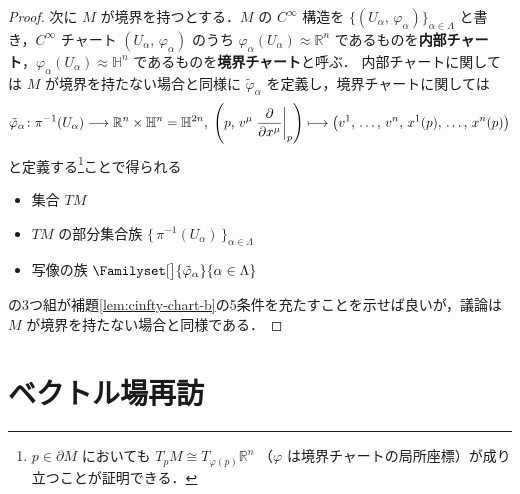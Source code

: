 \documentclass[geometry_main]{subfiles}
\begin{document}
\begin{proof}
    次に $M$ が境界を持つとする．$M$ の $C^\infty$ 構造を $\{(U_\alpha,\, \varphi_\alpha)\}_{\alpha \in \Lambda}$ と書き，$C^\infty$ チャート $(U_\alpha,\, \varphi_\alpha)$ のうち $\varphi_\alpha(U_\alpha) \approx \mathbb{R}^n$ であるものを\textbf{内部チャート}，$\varphi_\alpha(U_\alpha) \approx \mathbb{H}^n$ であるものを\textbf{境界チャート}と呼ぶ．
    内部チャートに関しては $M$ が境界を持たない場合と同様に $\tilde{\varphi}_\alpha$ を定義し，境界チャートに関しては
    \begin{align}
        \tilde{\varphi}_\alpha \colon \pi^{-1} (U_\alpha) \lto \mathbb{R}^{n} \times \mathbb{H}^n = \mathbb{H}^{2n},\; \left(p,\, v^\mu \eval{\pdv{}{x^\mu}}_p \right) \lmto \bigl( v^1,\, \dots,\, v^n,\, x^1 (p),\, \dots,\, x^n(p) \bigr)
    \end{align}
    と定義する\footnote{$p \in \partial M$ においても $T_p M \cong T_{\varphi(p)} \mathbb{R}^n$ （$\varphi$ は境界チャートの局所座標）が成り立つことが証明できる．}ことで得られる
    \begin{itemize}
        \item 集合 $TM$
        \item $TM$ の部分集合族 $\bigl\{\, \pi^{-1}(U_\alpha) \,\bigr\}_{\alpha \in \Lambda}$
        \item 写像の族 $\Familyset[\big]{\tilde{\varphi}_\alpha}{\alpha \in \Lambda}$
    \end{itemize}
    の3つ組が補題\ref{lem:cinfty-chart-b}の5条件を充たすことを示せば良いが，議論は $M$ が境界を持たない場合と同様である．
\end{proof}

\section{ベクトル場再訪}
\end{document}
